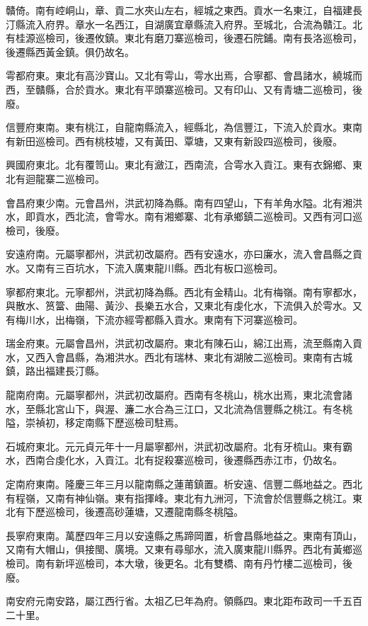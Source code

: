 贛倚。南有崆峒山，章、貢二水夾山左右，經城之東西。貢水一名東江，自福建長汀縣流入府界。章水一名西江，自湖廣宜章縣流入府界。至城北，合流為贛江。北有桂源巡檢司，後遷攸鎮。東北有磨刀寨巡檢司，後遷石院鋪。南有長洛巡檢司，後遷縣西黃金鎮。俱仍故名。

雩都府東。東北有高沙寶山。又北有雩山，雩水出焉，合寧都、會昌諸水，繞城而西，至贛縣，合於貢水。東北有平頭寨巡檢司。又有印山、又有青塘二巡檢司，後廢。

信豐府東南。東有桃江，自龍南縣流入，經縣北，為信豐江，下流入於貢水。東南有新田巡檢司。西有桃枝墟，又有黃田、覃塘，又東有新設四巡檢司，後廢。

興國府東北。北有覆笥山。東北有瀲江，西南流，合雩水入貢江。東有衣錦鄉、東北有迴龍寨二巡檢司。

會昌府東少南。元會昌州，洪武初降為縣。南有四望山，下有羊角水隘。北有湘洪水，即貢水，西北流，會雩水。南有湘鄉寨、北有承鄉鎮二巡檢司。又西有河口巡檢司，後廢。

安遠府南。元屬寧都州，洪武初改屬府。西有安遠水，亦曰廉水，流入會昌縣之貢水。又南有三百坑水，下流入廣東龍川縣。西北有板口巡檢司。

寧都府東北。元寧都州，洪武初降為縣。西北有金精山。北有梅嶺。南有寧都水，與散水、筼簹、曲陽、黃沙、長樂五水合，又東北有虔化水，下流俱入於雩水。又有梅川水，出梅嶺，下流亦經雩都縣入貢水。東南有下河寨巡檢司。

瑞金府東。元屬會昌州，洪武初改屬府。東北有陳石山，綿江出焉，流至縣南入貢水，又西入會昌縣，為湘洪水。西北有瑞林、東北有湖陂二巡檢司。東南有古城鎮，路出福建長汀縣。

龍南府南。元屬寧都州，洪武初改屬府。西南有冬桃山，桃水出焉，東北流會諸水，至縣北宮山下，與渥、濂二水合為三江口，又北流為信豐縣之桃江。有冬桃隘，崇禎初，移定南縣下歷巡檢司駐焉。

石城府東北。元元貞元年十一月屬寧都州，洪武初改屬府。北有牙梳山。東有霸水，西南合虔化水，入貢江。北有捉殺寨巡檢司，後遷縣西赤江市，仍故名。

定南府東南。隆慶三年三月以龍南縣之蓮莆鎮置。析安遠、信豐二縣地益之。西北有程嶺，又南有神仙嶺。東有指揮峰。東北有九洲河，下流會於信豐縣之桃江。東北有下歷巡檢司，後遷高砂蓮塘，又遷龍南縣冬桃隘。

長寧府東南。萬歷四年三月以安遠縣之馬蹄岡置，析會昌縣地益之。東南有頂山，又南有大帽山，俱接閩、廣境。又東有尋鄔水，流入廣東龍川縣界。西北有黃鄉巡檢司。南有新坪巡檢司，本大墩，後更名。北有雙橋、南有丹竹樓二巡檢司，後廢。

南安府元南安路，屬江西行省。太祖乙巳年為府。領縣四。東北距布政司一千五百二十里。

